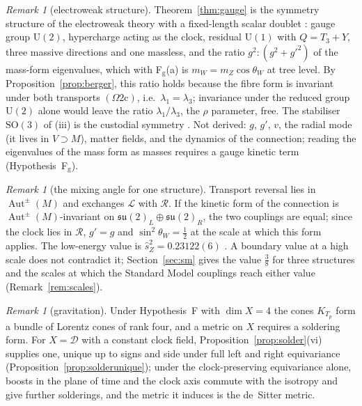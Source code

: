 \documentclass[aps,pra,onecolumn,superscriptaddress,nofootinbib,10pt]{revtex4-2}
\theoremstyle{definition}
\theoremstyle{remark}
\newtheorem{remark}[theorem]{Remark}
\newcommand{\su}{\mathfrak{su}}
\newcommand{\cL}{\mathcal{L}}
\newcommand{\cR}{\mathcal{R}}
\newcommand{\cD}{\mathcal{D}}
\newcommand{\Aut}{\operatorname{Aut}}
\newcommand{\SO}{\mathrm{SO}}
\newcommand{\U}{\mathrm{U}}
\begin{document}
\begin{remark}[electroweak structure]\label{rem:ew}
Theorem~\ref{thm:gauge} is the symmetry structure of the electroweak theory with a fixed-length scalar
doublet \cite{Weinberg67,AB80}: gauge group $\U(2)$, hypercharge acting as the clock, residual $\U(1)$
with $Q=T_3+Y$, three massive directions and one massless, and the ratio $g^2:(g^2+g'^2)$ of the mass-form
eigenvalues, which with F$_{\mathrm g}$(a) is $m_W=m_Z\cos\theta_W$ at tree level.  By
Proposition~\ref{prop:berger}, this ratio holds because the fibre form is invariant under both
transports $(\Omega2\mathrm c)$, i.e.\ $\lambda_1=\lambda_3$; invariance under the reduced group $\U(2)$ alone
would leave the ratio $\lambda_1/\lambda_3$, the $\rho$ parameter, free.  The stabiliser $\SO(3)$ of (iii) is
the custodial symmetry \cite{Veltman77,SSVZ}.  Not derived: $g$, $g'$, $v$, the radial mode (it lives in
$V\supset M$), matter fields, and the dynamics of the connection; reading the eigenvalues of the mass form as
masses requires a gauge kinetic term (Hypothesis~F$_{\mathrm g}$).
\end{remark}

\begin{remark}[the mixing angle for one structure]\label{rem:angle}
Transport reversal lies in $\Aut^\pm(M)$ and exchanges $\cL$ with $\cR$.  If the kinetic form of the
connection is $\Aut^\pm(M)$-invariant on $\su(2)_L\oplus\su(2)_R$, the two couplings are equal; since the
clock lies in $\cR$, $g'=g$ and $\sin^2\theta_W=\tfrac12$ at the scale at which this form applies.  The
low-energy value is $\hat s_Z^2=0.23122(6)$ \cite{ex-PDG26}.  A boundary value at a high scale does not contradict it;
Section~\ref{sec:sm} gives the value $\tfrac38$ for three structures and the scales at which the
Standard Model couplings reach either value (Remark~\ref{rem:scales}).
\end{remark}

\begin{remark}[gravitation]\label{rem:gravity}
Under Hypothesis~F with $\dim X=4$ the cones $K_{T_p}$ form a bundle of Lorentz cones of rank four, and
a metric on $X$ requires a soldering form.  For $X=\cD$ with a constant clock field,
Proposition~\ref{prop:solder}(vi) supplies one, unique up to signs and side under full left and
right equivariance (Proposition~\ref{prop:solderunique}); under the clock-preserving equivariance alone,
boosts in the plane of time and the clock axis commute with the isotropy and give further solderings, and the metric it induces is the de~Sitter metric.
\end{remark}
\end{document}
